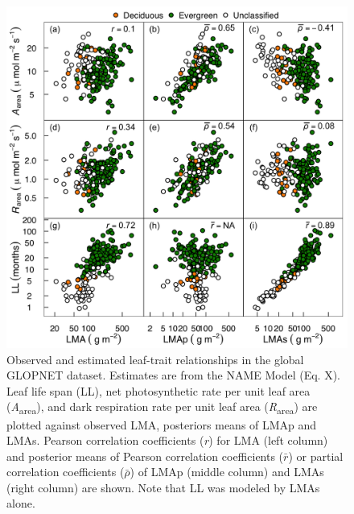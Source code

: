 \documentclass[
  12pt,
]{article}
\providecommand{\DIFdelend}{} %
\providecommand{\DIFaddbeginFL}{} %
\providecommand{\DIFaddendFL}{} %
\providecommand{\DIFdelbeginFL}{} %
\providecommand{\DIFdelendFL}{} %
\newcommand{\DIFscaledelfig}{0.5}
\newlength{\DIFdelgraphicswidth} %
\newlength{\DIFdelgraphicsheight} %
\newcommand{\DIFaddincludegraphics}[2][]{{\color{blue}\fbox{\DIFOincludegraphics[#1]{#2}}}} %
\newcommand{\DIFdelincludegraphics}[2][]{%
\sbox{\DIFdelgraphicsbox}{\DIFOincludegraphics[#1]{#2}}%
\settoboxwidth{\DIFdelgraphicswidth}{\DIFdelgraphicsbox} %
\settoboxtotalheight{\DIFdelgraphicsheight}{\DIFdelgraphicsbox} %
\scalebox{\DIFscaledelfig}{%
\parbox[b]{\DIFdelgraphicswidth}{\usebox{\DIFdelgraphicsbox}\\[-\baselineskip] \rule{\DIFdelgraphicswidth}{0em}}\llap{\resizebox{\DIFdelgraphicswidth}{\DIFdelgraphicsheight}{%
\setlength{\unitlength}{\DIFdelgraphicswidth}%
\begin{picture}(1,1)%
\thicklines\linethickness{2pt} %
{\color[rgb]{1,0,0}\put(0,0){\framebox(1,1){}}}%
{\color[rgb]{1,0,0}\put(0,0){\line( 1,1){1}}}%
{\color[rgb]{1,0,0}\put(0,1){\line(1,-1){1}}}%
\end{picture}%
}\hspace*{3pt}}} %
} %
\DeclareRobustCommand{\DIFdelend}{\DIFOaddend \let\includegraphics\DIFOincludegraphics} %
\DeclareRobustCommand{\DIFaddbeginFL}{\DIFOaddbeginFL \let\includegraphics\DIFaddincludegraphics} %
\DeclareRobustCommand{\DIFaddendFL}{\DIFOaddendFL \let\includegraphics\DIFOincludegraphics} %
\DeclareRobustCommand{\DIFdelbeginFL}{\DIFOdelbeginFL \let\includegraphics\DIFdelincludegraphics} %
\DeclareRobustCommand{\DIFdelendFL}{\DIFOaddendFL \let\includegraphics\DIFOincludegraphics} %
\begin{document}
\DIFdelend \begin{figure}
\DIFdelbeginFL %
\DIFdelendFL \DIFaddbeginFL \hypertarget{fig:GLplt}{%
\centering
\includegraphics{../figs/GL_scatter.png}
\caption{Observed and estimated leaf-trait relationships in the global GLOPNET dataset.
Estimates are from the NAME Model (Eq. X).
Leaf life span (LL), net photosynthetic rate per unit leaf area (\emph{A}\textsubscript{area}), and dark respiration rate per unit leaf area (\emph{R}\textsubscript{area}) are plotted against observed LMA, posteriors means of LMAp and LMAs.
Pearson correlation coefficients (\emph{r}) for LMA (left column) and posterior means of Pearson correlation coefficients (\(\bar{r}\)) or partial correlation coefficients (\(\bar{\rho}\)) of LMAp (middle column) and LMAs (right column) are shown.
Note that LL was modeled by LMAs alone.}\label{fig:GLplt}
}
\DIFaddendFL \end{figure}
\end{document}
